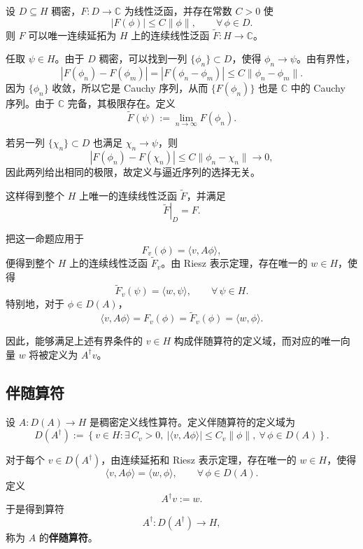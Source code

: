 \documentclass[UTF8,a4paper,11pt,openany]{ctexbook}
\begin{document}
\begin{proposition}[稠密子空间上线性泛函的连续延拓]
设 $D\subseteq H$ 稠密，$F:D\to\mathbb C$ 为线性泛函，并存在常数 $C>0$ 使
\[
|F(\phi)|
\leq
C\|\phi\|,
\qquad
\forall\,\phi\in D.
\]
则 $F$ 可以唯一连续延拓为 $H$ 上的连续线性泛函 $\widetilde F:H\to\mathbb C$。
\end{proposition}

\begin{proofblock}
任取 $\psi\in H$。由于 $D$ 稠密，可以找到一列 $\{\phi_n\}\subset D$，使得 $\phi_n\to\psi$。由有界性，
\[
|F(\phi_n)-F(\phi_m)|
=
|F(\phi_n-\phi_m)|
\leq
C\|\phi_n-\phi_m\|.
\]
因为 $\{\phi_n\}$ 收敛，所以它是 Cauchy 序列，从而 $\{F(\phi_n)\}$ 也是 $\mathbb C$ 中的 Cauchy 序列。由于 $\mathbb C$ 完备，其极限存在。定义
\begin{equation}
    \widetilde F(\psi)
    :=
    \lim_{n\to\infty}F(\phi_n).
\end{equation}

若另一列 $\{\chi_n\}\subset D$ 也满足 $\chi_n\to\psi$，则
\[
|F(\phi_n)-F(\chi_n)|
\leq
C\|\phi_n-\chi_n\|
\longrightarrow0,
\]
因此两列给出相同的极限，故定义与逼近序列的选择无关。

这样得到整个 $H$ 上唯一的连续线性泛函 $\widetilde F$，并满足
\[
\left.\widetilde F\right|_D=F.
\]
\end{proofblock}

把这一命题应用于
\[
F_v(\phi)=\langle v,A\phi\rangle,
\]
便得到整个 $H$ 上的连续线性泛函 $\widetilde F_v$。由 Riesz 表示定理，存在唯一的 $w\in H$，使得
\begin{equation}
    \widetilde F_v(\psi)
    =
    \langle w,\psi\rangle,
    \qquad
    \forall\,\psi\in H.
\end{equation}
特别地，对于 $\phi\in D(A)$，
\[
\langle v,A\phi\rangle
=
F_v(\phi)
=
\widetilde F_v(\phi)
=
\langle w,\phi\rangle.
\]

因此，能够满足上述有界条件的 $v\in H$ 构成伴随算符的定义域，而对应的唯一向量 $w$ 将被定义为 $A^\dagger v$。

\subsection{伴随算符}

\begin{definition}[伴随算符]
设 $A:D(A)\to H$ 是稠密定义线性算符。定义伴随算符的定义域为
\begin{equation}
    D(A^\dagger)
    :=
    \left\{
    v\in H:
    \exists\,C_v>0,\ 
    |\langle v,A\phi\rangle|
    \leq
    C_v\|\phi\|,
    \ \forall\,\phi\in D(A)
    \right\}.
\end{equation}

对于每个 $v\in D(A^\dagger)$，由连续延拓和 Riesz 表示定理，存在唯一的 $w\in H$，使得
\[
\langle v,A\phi\rangle
=
\langle w,\phi\rangle,
\qquad
\forall\,\phi\in D(A).
\]
定义
\begin{equation}
    A^\dagger v:=w.
\end{equation}
于是得到算符
\[
A^\dagger:D(A^\dagger)\to H,
\]
称为 $A$ 的\textbf{伴随算符}。
\end{definition}
\end{document}
